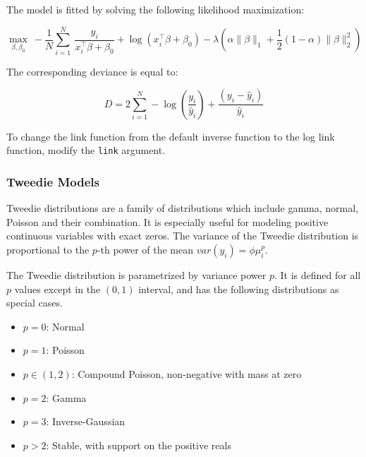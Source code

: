 The model is fitted by solving the following likelihood maximization:

$$  \max_{\beta,\beta_0} \  - \frac{1}{N}  \sum_{i=1}^N  \ \frac{y_i}{x_i^{\top}\beta+\beta_0 } + \log(x_i^{\top}\beta + \beta_0) -\lambda \left(  \alpha \| \beta \|_1 + \frac{1}{2}(1-\alpha)\| \beta \|_2^2  \right) $$

The corresponding deviance is equal to:

$$D = 2\sum_{i=1}^{N} - \log\left({\frac{ y_i }{\hat{y}_i}}\right) + \frac{(y_i - \hat{y}_i)}{\hat{y}_i} $$

To change the link function from the default inverse function to the log link function, modify the \texttt{link}
argument. 

\waterExampleInR



\newpage
\waterExampleInPython


\subsubsection{Tweedie Models}

Tweedie distributions are a family of distributions which include gamma, normal, Poisson and their combination. It is especially useful for modeling positive continuous variables with exact zeros. The variance of the Tweedie distribution is proportional to the $p$-th power of the mean $var(y_i)=\phi \mu_i^p$. 

The Tweedie distribution is parametrized by variance power $p$. It is defined for all $p$ values except in the $(0,1)$ interval, and has the following distributions as special cases.

\begin{itemize}
\item  $p=0$: Normal
\item  $p=1$: Poisson
\item $p\in(1, 2)$: Compound Poisson, non-negative with mass at zero
\item $p=2$: Gamma
\item $p=3$: Inverse-Gaussian
\item $p>2$:  Stable, with support on the positive reals %
\end{itemize}

